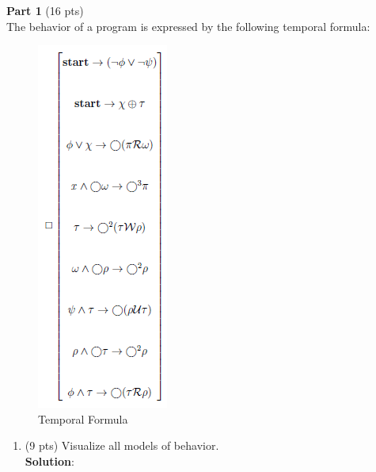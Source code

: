 \documentclass[12pt]{article}
\begin{document}
\begin{spacing}{1.5}
	\textbf{Part 1} (16 pts)\\
							    
	The behavior of a program is expressed by the following temporal formula:
							
	\begin{figure}[htp]
		\centering
		\includegraphics{static/templogicfigure.png}
		\caption{Temporal Formula}
		\label{fig:figure}
	\end{figure}
							
    \newpage
							
	\begin{enumerate}
		\item (9 pts) Visualize all models of behavior.\\
		      \textbf{Solution}:\\
		      \begin{center}
\end{center}
\end{enumerate}
\end{spacing}
\end{document}
